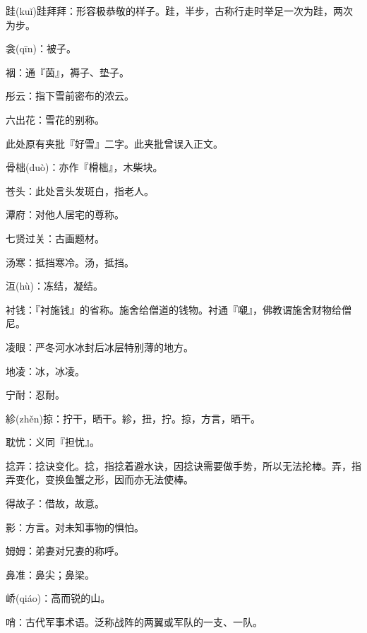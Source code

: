 \startbuffer[1533]
跬(kuĭ)跬拜拜：形容极恭敬的样子。跬，半步，古称行走时举足一次为跬，两次为步。
\stopbuffer


\startbuffer[1534]
衾(qīn)：被子。
\stopbuffer


\startbuffer[1535]
裀：通『茵』，褥子、垫子。
\stopbuffer


\startbuffer[1536]
彤云：指下雪前密布的浓云。
\stopbuffer


\startbuffer[1537]
六出花：雪花的别称。
\stopbuffer


\startbuffer[1538]
此处原有夹批『好雪』二字。此夹批曾误入正文。
\stopbuffer


\startbuffer[1539]
骨柮(duò)：亦作『榾柮』，木柴块。
\stopbuffer


\startbuffer[1540]
苍头：此处言头发斑白，指老人。
\stopbuffer


\startbuffer[1541]
潭府：对他人居宅的尊称。
\stopbuffer


\startbuffer[1542]
七贤过关：古画题材。
\stopbuffer


\startbuffer[1543]
汤寒：抵挡寒冷。汤，抵挡。
\stopbuffer


\startbuffer[1544]
沍(hù)：冻结，凝结。
\stopbuffer


\startbuffer[1545]
衬钱：『衬施钱』的省称。施舍给僧道的钱物。衬通『嚫』，佛教谓施舍财物给僧尼。
\stopbuffer


\startbuffer[1546]
凌眼：严冬河水冰封后冰层特别薄的地方。
\stopbuffer


\startbuffer[1547]
地凌：冰，冰凌。
\stopbuffer


\startbuffer[1548]
宁耐：忍耐。
\stopbuffer


\startbuffer[1549]
紾(zhěn)掠：拧干，晒干。紾，扭，拧。掠，方言，晒干。
\stopbuffer


\startbuffer[1550]
耽忧：义同『担忧』。
\stopbuffer


\startbuffer[1551]
捻弄：捻诀变化。捻，指捻着避水诀，因捻诀需要做手势，所以无法抡棒。弄，指弄变化，变换鱼蟹之形，因而亦无法使棒。
\stopbuffer


\startbuffer[1552]
得故子：借故，故意。
\stopbuffer


\startbuffer[1553]
影：方言。对未知事物的惧怕。
\stopbuffer


\startbuffer[1554]
姆姆：弟妻对兄妻的称呼。
\stopbuffer


\startbuffer[1555]
鼻准：鼻尖；鼻梁。
\stopbuffer


\startbuffer[1556]
峤(qiáo)：高而锐的山。
\stopbuffer


\startbuffer[1557]
哨：古代军事术语。泛称战阵的两翼或军队的一支、一队。
\stopbuffer


